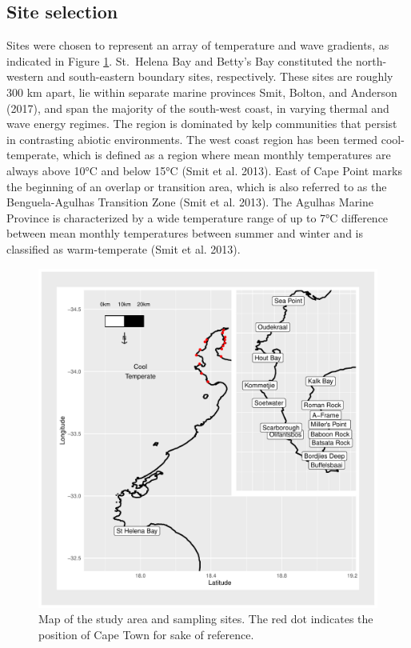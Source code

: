 \documentclass[
  a4paper,
]{article}
\begin{document}
\hypertarget{site-selection}{%
\subsection{Site selection}\label{site-selection}}

Sites were chosen to represent an array of temperature and wave
gradients, as indicated in Figure \ref{fig:map}. St.~Helena Bay and
Betty's Bay constituted the north-western and south-eastern boundary
sites, respectively. These sites are roughly 300 km apart, lie within
separate marine provinces Smit, Bolton, and Anderson (2017), and span
the majority of the south-west coast, in varying thermal and wave energy
regimes. The region is dominated by kelp communities that persist in
contrasting abiotic environments. The west coast region has been termed
cool-temperate, which is defined as a region where mean monthly
temperatures are always above 10°C and below 15°C (Smit et al. 2013).
East of Cape Point marks the beginning of an overlap or transition area,
which is also referred to as the Benguela-Agulhas Transition Zone (Smit
et al. 2013). The Agulhas Marine Province is characterized by a wide
temperature range of up to 7°C difference between mean monthly
temperatures between summer and winter and is classified as
warm-temperate (Smit et al. 2013).

\begin{figure}

{\centering \includegraphics{thesis_chapter_2_files/figure-latex/map-1} 

}

\caption{\label{fig:map}Map of the study area and sampling sites. The red dot indicates the position of Cape Town for sake of reference.}\label{fig:map}
\end{figure}
\end{document}
